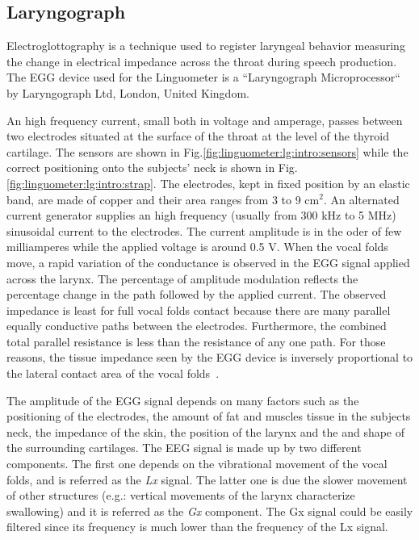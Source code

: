 \subsection{Laryngograph}
\label{ch:linguometer:instrumentation:lg}
Electroglottography is a technique used to register laryngeal behavior measuring
the change in electrical impedance across the throat during speech production.
The EGG device used for the Linguometer is a ``Laryngograph Microprocessor`` by
Laryngograph Ltd, London, United Kingdom. 


An high frequency current, small both in voltage and amperage, passes between
two electrodes situated at the surface of the throat at the level of the 
thyroid cartilage. The sensors are shown in 
Fig.\ref{fig:linguometer:lg:intro:sensors} while the correct positioning onto
the subjects' neck is shown in Fig.\ref{fig:linguometer:lg:intro:strap}.
The electrodes, kept in fixed position by an elastic band, are made of copper
and their area ranges from 3 to 9 cm$^{2}$.
An alternated current generator supplies an high frequency (usually from 300 kHz
to 5 MHz) sinusoidal current to the electrodes. The current amplitude is in the
oder of few milliamperes while the applied voltage is around 0.5 V.
When the vocal folds move, a rapid variation of the conductance is observed in
the EGG signal applied across the larynx.
The percentage of amplitude modulation reflects the percentage change in the
path followed by the applied current. 
The observed impedance is least for full vocal folds contact because there are 
many parallel equally conductive paths between the electrodes.
Furthermore, the combined total parallel resistance is less than the resistance
of any one path. 
For those reasons, the tissue impedance seen by the EGG device is inversely
proportional to the lateral contact area of the vocal 
folds~\citep{childers.krishnamurthy:1985}.


The amplitude of the EGG signal depends on many factors such as the
positioning of the electrodes, the amount of fat and muscles tissue in the 
subjects neck, the impedance of the skin, the position of the 
larynx and the and shape of the surrounding cartilages.
The EEG signal is made up by two different components. The first one depends on
the vibrational movement of the vocal folds, and is referred as the 
\emph{Lx} signal. 
The latter one is due the slower movement of other structures (e.g.: vertical
movements of the larynx characterize swallowing) and it is referred as the
\emph{Gx} component. The Gx signal could be easily filtered since its frequency
is much lower than the frequency of the Lx signal.

